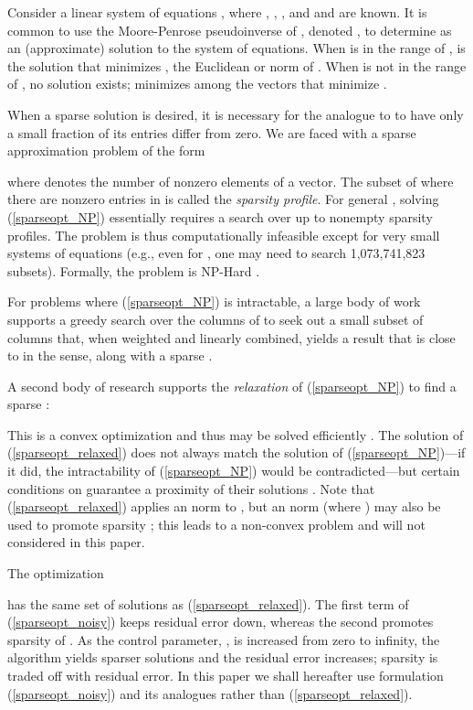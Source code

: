 \documentclass[final]{siamltex}
\newcommand{\la}[1]{\mbox{}}  \newcommand{\sst}[1]{\mbox{\scriptsize{#1}}}
\begin{document}
   Consider a linear system of equations ,
   where , , , and  and  are
   known.  It is common to use the Moore-Penrose pseudoinverse of
   , denoted , to determine  as an (approximate) solution to the system
   of equations.  When  is in the range of ,
    is the solution that minimizes , the Euclidean or  norm of .  When
    is not in the range of , no solution exists;
    minimizes  among the
   vectors that minimize .
   
   When a sparse solution is desired, it is necessary for the analogue
   to  to have only a small fraction of its entries
   differ from zero.  We are faced with a sparse approximation problem
   of the form
   
   where  denotes the number of nonzero elements of a
   vector.  The subset of  where there are
   nonzero entries in \la{g} is called the \emph{sparsity profile}.
   For general , solving (\ref{sparseopt_NP}) essentially
   requires a search over up to  nonempty sparsity profiles.
   The problem is thus computationally infeasible except for very
   small systems of equations (e.g., even for , one may need
   to search 1,073,741,823 subsets).  Formally, the problem is
   NP-Hard \cite{Dav1994,Nat1995}.

   For problems where (\ref{sparseopt_NP}) is intractable, a large
   body of work supports a greedy search over the columns of \la{F} to
   seek out a small subset of columns that, when weighted and linearly
   combined, yields a result that is close to \la{d} in the 
   sense, along with a sparse \la{g} \cite{Mal1993, Nat1995, Che1995,
   Dav1997, Cot1999}.

   A second body of research supports the {\em{relaxation}} of 
   (\ref{sparseopt_NP}) to find a sparse \la{g} \cite{Che1998}:
   
   This is a convex optimization and thus may be solved efficiently
   \cite{Boy2004}.  The solution of (\ref{sparseopt_relaxed}) does not
   always match the solution of (\ref{sparseopt_NP})---if it did, the
   intractability of (\ref{sparseopt_NP}) would be contradicted---but
   certain conditions on  guarantee a proximity of their
   solutions \cite{Don2006b, Don2006c, Tro2006_convexIT}.
   Note that (\ref{sparseopt_relaxed}) applies an  norm to
   , but an  norm (where ) may also be used to
   promote sparsity \cite{Gor1997, Che1998}; this leads to a
   non-convex problem and will not considered in this paper.

   The optimization
   
   has the same set of solutions as (\ref{sparseopt_relaxed}).  The
   first term of (\ref{sparseopt_noisy}) keeps residual error down,
   whereas the second promotes sparsity of \la{g} \cite{Tib1996,
   Che1998}.  As the control parameter, , is increased from
   zero to infinity, the algorithm yields sparser solutions and the
   residual error increases; sparsity is traded off with residual
   error.  In this paper we shall hereafter use formulation
   (\ref{sparseopt_noisy}) and its analogues rather than
   (\ref{sparseopt_relaxed}).
\end{document}
